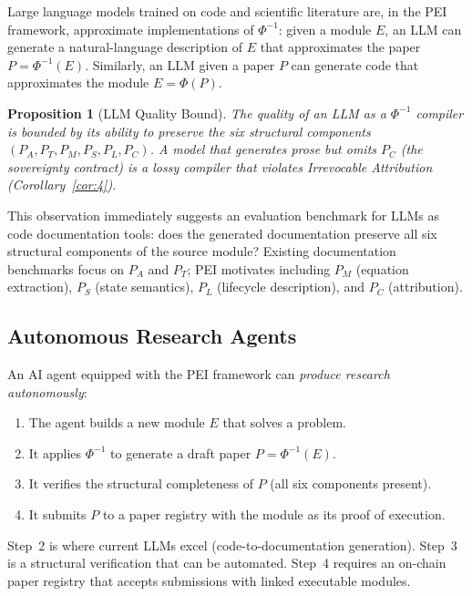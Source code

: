 \documentclass[12pt]{article}
\newtheorem{proposition}[theorem]{Proposition}
\begin{document}
Large language models trained on code and scientific literature are,
in the PEI framework, approximate implementations of $\Phi^{-1}$: given a
module $E$, an LLM can generate a natural-language description of $E$ that
approximates the paper $P = \Phi^{-1}(E)$.  Similarly, an LLM given a paper
$P$ can generate code that approximates the module $E = \Phi(P)$.

\begin{proposition}[LLM Quality Bound]
  The quality of an LLM as a $\Phi^{-1}$ compiler is bounded by its ability
  to preserve the six structural components $(P_A, P_T, P_M, P_S, P_L, P_C)$.
  A model that generates prose but omits $P_C$ (the sovereignty contract) is
  a lossy compiler that violates Irrevocable Attribution
  (Corollary~\ref{cor:4}).
\end{proposition}

This observation immediately suggests an evaluation benchmark for LLMs as
code documentation tools: does the generated documentation preserve all six
structural components of the source module?  Existing documentation benchmarks
focus on $P_A$ and $P_T$; PEI motivates including $P_M$ (equation extraction),
$P_S$ (state semantics), $P_L$ (lifecycle description), and $P_C$ (attribution).

\subsection{Autonomous Research Agents}

An AI agent equipped with the PEI framework can \emph{produce research
autonomously}:

\begin{enumerate}[label=(\arabic*)]
  \item The agent builds a new module $E$ that solves a problem.
  \item It applies $\Phi^{-1}$ to generate a draft paper $P = \Phi^{-1}(E)$.
  \item It verifies the structural completeness of $P$ (all six components
    present).
  \item It submits $P$ to a paper registry with the module as its proof of
    execution.
\end{enumerate}

Step~2 is where current LLMs excel (code-to-documentation generation).
Step~3 is a structural verification that can be automated.
Step~4 requires an on-chain paper registry that accepts submissions with
linked executable modules.
\end{document}
